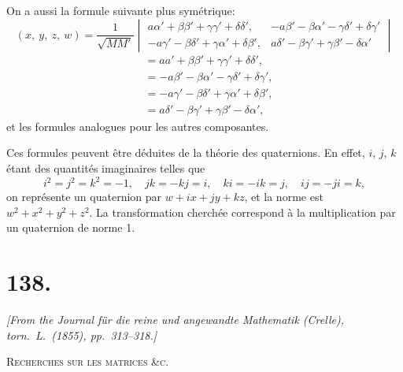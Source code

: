 \documentclass[11pt,a4paper]{book}
\begin{document}
\newpage
\setcounter{page}{215}

On a aussi la formule suivante plus sym\'{e}trique:
\[
(x,\ y,\ z,\ w) =
\frac{1}{\sqrt{MM'}}
\begin{vmatrix}
a\alpha' + \beta\beta' + \gamma\gamma' + \delta\delta', &
-a\beta' - \beta\alpha' - \gamma\delta' + \delta\gamma' \\
-a\gamma' - \beta\delta' + \gamma\alpha' + \delta\beta', &
a\delta' - \beta\gamma' + \gamma\beta' - \delta\alpha'
\end{vmatrix}
\]
\[
\begin{aligned}
&= aa' + \beta\beta' + \gamma\gamma' + \delta\delta', \\
&= -a\beta' - \beta\alpha' - \gamma\delta' + \delta\gamma', \\
&= -a\gamma' - \beta\delta' + \gamma\alpha' + \delta\beta', \\
&= a\delta' - \beta\gamma' + \gamma\beta' - \delta\alpha',
\end{aligned}
\]
et les formules analogues pour les autres composantes.

\newpage
\setcounter{page}{216}

Ces formules peuvent \^{e}tre d\'{e}duites de la th\'{e}orie des quaternions. En effet, $i$, $j$, $k$ \'{e}tant des quantit\'{e}s imaginaires telles que
\[
i^2 = j^2 = k^2 = -1,\quad jk = -kj = i,\quad ki = -ik = j,\quad ij = -ji = k,
\]
on repr\'{e}sente un quaternion par $w + ix + jy + kz$, et la norme est $w^2 + x^2 + y^2 + z^2$. La transformation cherch\'{e}e correspond \`{a} la multiplication par un quaternion de norme 1.

\newpage
\setcounter{page}{217}


\section*{138.}

\begin{flushright}
\textit{[From the Journal f\"{u}r die reine und angewandte Mathematik (Crelle),}\\
\textit{torn.\ L.\ (1855), pp.\ 313--318.]}
\end{flushright}

\textsc{Recherches sur les matrices \&c.}
\end{document}
